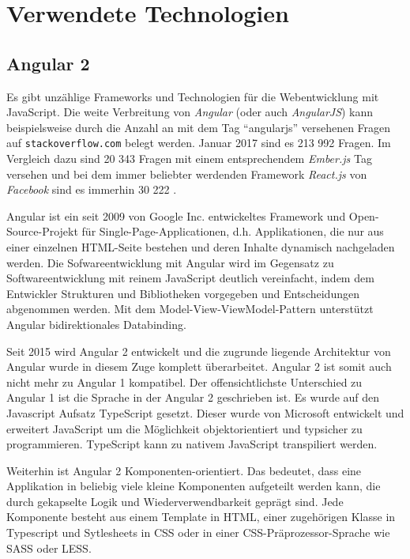 \chapter{Verwendete Technologien}
\label{Verwendete Technologien}

\section{Angular 2}
Es gibt unzählige Frameworks und Technologien für die Webentwicklung mit Java\-Script. Die weite Verbreitung von \emph{Angular} (oder auch \emph{AngularJS}) kann beispielsweise durch die Anzahl an mit dem Tag "`angularjs"' versehenen Fragen auf \texttt{stackoverflow.com} belegt werden. Januar 2017 sind es 213 992 Fragen. Im Vergleich dazu sind 20 343 Fragen mit einem entsprechendem \emph{Ember.js} Tag versehen und bei dem immer beliebter werdenden Framework \emph{React.js} von \emph{Facebook} sind es immerhin 30 222 \cite{stackoverflow}.

Angular ist ein seit 2009 von Google Inc. entwickeltes Framework und Open-Source-Projekt für Single-Page-Applicationen, d.h. Applikationen, die nur aus einer einzelnen HTML-Seite bestehen und deren Inhalte dynamisch nachgeladen werden. Die Sofwareentwicklung mit Angular wird im Gegensatz zu Softwareentwicklung mit reinem JavaScript deutlich vereinfacht, indem dem Entwickler Strukturen und Bibliotheken vorgegeben und Entscheidungen abgenommen werden. Mit dem Model-View-ViewModel-Pattern unterstützt Angular bidirektionales Databinding.

Seit 2015 wird Angular 2 entwickelt und die zugrunde liegende Architektur von Angular wurde in diesem Zuge komplett überarbeitet. Angular 2 ist somit auch nicht mehr zu Angular 1 kompatibel. Der offensichtlichste Unterschied zu Angular 1 ist die Sprache in der Angular 2 geschrieben ist. Es wurde auf den Javascript Aufsatz TypeScript gesetzt. Dieser wurde von Microsoft entwickelt und erweitert JavaScript um die Möglichkeit objektorientiert und typsicher zu programmieren. TypeScript kann zu nativem JavaScript transpiliert werden.

Weiterhin ist Angular 2 Komponenten-orientiert. Das bedeutet, dass eine Applikation in beliebig viele kleine Komponenten aufgeteilt werden kann, die durch gekapselte Logik und Wiederverwendbarkeit geprägt sind. Jede Komponente besteht aus einem Template in HTML, einer zugehörigen Klasse in Typescript und Sytlesheets in CSS oder in einer CSS-Präprozessor-Sprache wie SASS oder LESS.

